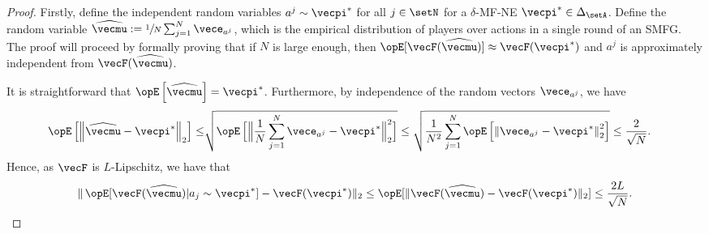 \begin{proof}
Firstly, define the independent random variables $a^j \sim \vecpi^*$ for all $j\in\setN$ for a $\delta$-MF-NE $\vecpi^* \in \Delta_\setA$.
Define the random variable $\widehat{\vecmu} := \sfrac{1}{N} \sum_{j=1}^N \vece_{a^j}$, which is the empirical distribution of players over actions in a single round of an SMFG.
The proof will proceed by formally proving that if $N$ is large enough, then $\Exop[\vecF(\widehat{\vecmu})] \approx \vecF(\vecpi^*)$ and $a^j$ is approximately independent from $\vecF(\widehat{\vecmu})$.

It is straightforward that $\Exop \left[ \widehat{\vecmu}  \right] = \vecpi^*$.
Furthermore, by independence of the random vectors $\vece_{a^j}$, we have
\begin{align*}
    \Exop \left[ \left\| \widehat{\vecmu} - \vecpi^* \right\|_2  \right] \leq
    &\sqrt{\Exop \Big[ \Big\| \frac{1}{N} \sum_{j=1}^N \vece_{a^j} - \vecpi^* \Big\|_2^2  \Big]} 
    \leq  \sqrt{\frac{1}{N^2} \sum_{j=1}^N \Exop \left[  \left\| \vece_{a^j} - \vecpi^* \right\|_2^2 \right]} \leq \frac{2}{\sqrt{N}}.
\end{align*}
Hence, as $\vecF$ is $L$-Lipschitz, we have that
\begin{align}\label{eq:theorem1:ineq2}
\|\Exop[\vecF(\widehat{\vecmu})|a_j\sim \vecpi^*] - \vecF(\vecpi^*)\|_2 \leq \Exop[\|\vecF(\widehat{\vecmu}) - \vecF(\vecpi^*) \|_2] \leq \frac{2L}{\sqrt{N}}.
\end{align}


\end{proof}
